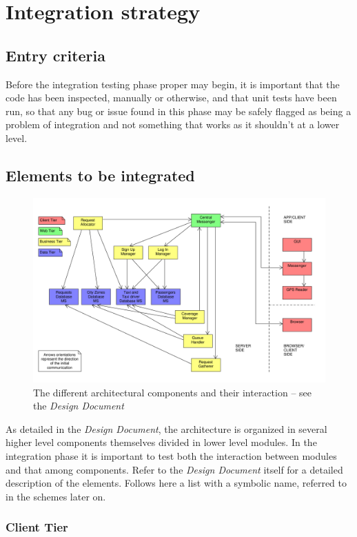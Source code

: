 \chapter{Integration strategy}


\section{Entry criteria}
Before the integration testing phase proper may begin, it is important that the code has been inspected, manually or otherwise, and that unit tests have been run, so that any bug or issue found in this phase may be safely flagged as being a problem of integration and not something that works as it shouldn't at a lower level.


\section{Elements to be integrated}
\begin{figure}
\centering
\includegraphics[width=\textwidth]{tex-images/interactions}
\caption{The different architectural components and their interaction -- see the \emph{Design Document}}
\end{figure}
As detailed in the \emph{Design Document}, the architecture is organized in several higher level components themselves divided in lower level modules. In the integration phase it is important to test both the interaction between modules and that among components. Refer to the \emph{Design Document} itself for a detailed description of the elements. Follows here a list with a symbolic name, referred to in the schemes later on.

\subsection{Client Tier}
